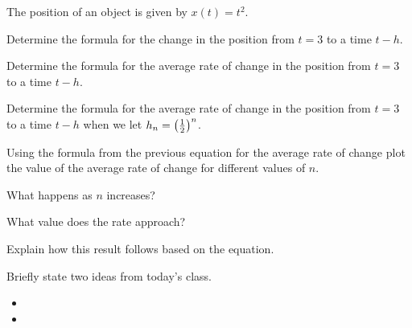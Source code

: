 \begin{problem}
  \clearpage

\item The position of an object is given by $x(t)=t^2$. 
  \begin{subproblem}
    \item Determine the formula for the change in the position from
      $t=3$ to a time $t-h$.
      \vfill

    \item Determine the formula for the average rate of change in the
      position from $t=3$ to a time $t-h$.
      \vfill

    \item Determine the formula for the average rate of change in the
      position from $t=3$ to a time $t-h$ when we let $h_n=\left(\frac{1}{2}\right)^n$.

      \vspace{3em}

  \end{subproblem}


  \clearpage

\item Using the formula from the previous equation for the average
  rate of change plot the value of the average rate of change for
  different values of $n$.

  \scalebox{0.7}{}

  \begin{subproblem}
    \item What happens as $n$ increases?
      \vspace{3em}
    \item What value does the rate approach?
      \vspace{3em}
    \item Explain how this result follows based on the equation.
      \vspace{3em}
  \end{subproblem}

\end{problem}

\postClass

\begin{problem}
\item Briefly state two ideas from today's class.
  \begin{itemize}
  \item 
  \item 
  \end{itemize}
\item 
  \begin{subproblem}
    \item
  \end{subproblem}
\end{problem}



